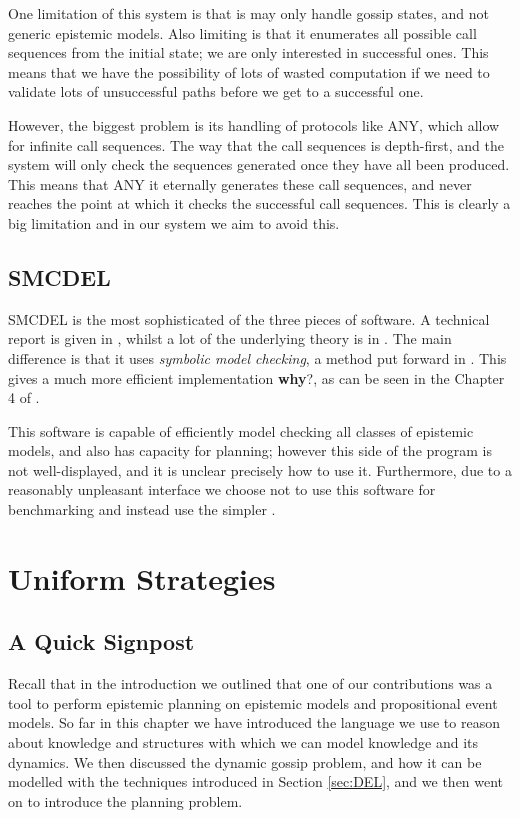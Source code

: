 \documentclass[10pt, a4paper]{report}
\begin{document}
One limitation of this system is that is may only handle gossip states, and not
generic epistemic models. Also limiting is that it enumerates all possible call
sequences from the initial state; we are only interested in successful ones.
This means that we have the possibility of lots of wasted computation if we need
to validate lots of unsuccessful paths before we get to a successful one.

However, the biggest problem is its handling of protocols like \textsf{ANY},
which allow for infinite call sequences. The way that the call sequences is
depth-first, and the system will only check the sequences generated once they
have all been produced. This means that \textsf{ANY} it eternally generates
these call sequences, and never reaches the point at which it checks the
successful call sequences. This is clearly a big limitation and in our system we
aim to avoid this. 

\subsection{SMCDEL}

SMCDEL is the most sophisticated of the three pieces of software. A technical
report is given in \cite{SMCDEL}, whilst a lot of the underlying theory is in
\cite{MalvinThesis}. The main difference is that it uses \emph{symbolic model
  checking}, a method put forward in \cite{SymbolicModelChecking}. This gives a
much more efficient implementation \textbf{why}?, as can be seen in the
Chapter 4 of \cite{MalvinThesis}.

This software is capable of efficiently model checking all classes of epistemic
models, and also has capacity for planning; however this side of the program is
not well-displayed, and it is unclear precisely how to use it. Furthermore, due
to a reasonably unpleasant interface we choose not to use this software for
benchmarking and instead use the simpler \cite{GithubGossip}. 


\section{Uniform Strategies}
\label{sec:UniformStrategies}

\subsection{A Quick Signpost}

Recall that in the introduction we outlined that one of our contributions was a
tool to perform epistemic planning on epistemic models and propositional event
models. So far in this chapter we have introduced the language we use to reason
about knowledge and structures with which we can model knowledge and its
dynamics. We then discussed the dynamic gossip problem, and how it can be
modelled with the techniques introduced in Section \ref{sec:DEL}, and we then
went on to introduce the planning problem. 
\end{document}
